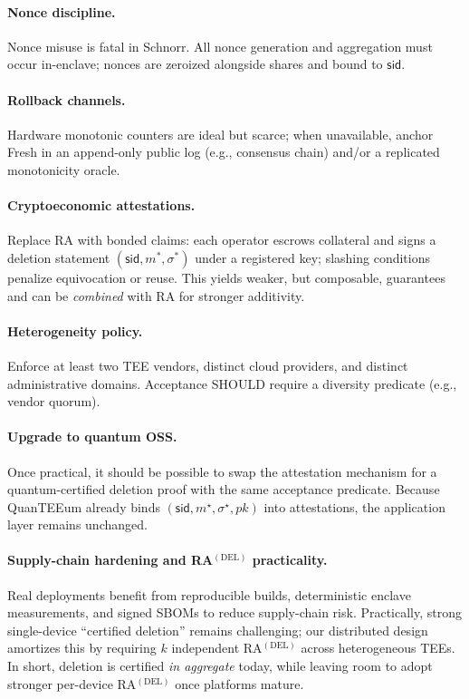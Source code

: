 \documentclass[runningheads,orivec]{llncs}
\newcommand{\prot}{\textsf{QuanTEEum}}
\newcommand{\sid}{\mathsf{sid}}
\begin{document}
\paragraph{Nonce discipline.}
Nonce misuse is fatal in Schnorr. All nonce generation and aggregation must occur in-enclave; nonces are zeroized alongside shares and bound to $\sid$.

\paragraph{Rollback channels.}
Hardware monotonic counters are ideal but scarce; when unavailable, anchor \textsf{Fresh} in an append-only public log (e.g., consensus chain) and/or a replicated monotonicity oracle.

\paragraph{Cryptoeconomic attestations.}
Replace RA with bonded claims: each operator escrows collateral and signs a deletion statement $(\sid,m^{*},\sigma^{*})$ under a registered key; slashing conditions penalize equivocation or reuse. This yields weaker, but composable, guarantees and can be \emph{combined} with RA for stronger additivity.

\paragraph{Heterogeneity policy.}
Enforce at least two TEE vendors, distinct cloud providers, and distinct administrative domains. Acceptance SHOULD require a diversity predicate (e.g., vendor quorum).

\paragraph{Upgrade to quantum OSS.}
Once practical, it should be possible to swap the attestation mechanism for a quantum-certified deletion proof with the same acceptance predicate. Because \prot{} already binds $(\mathsf{sid},m^{\star},\sigma^{\star},pk)$ into attestations, the application layer remains unchanged.

\paragraph{Supply-chain hardening and RA$^{(\mathrm{DEL})}$ practicality.}
Real deployments benefit from reproducible builds, deterministic enclave measurements, and signed SBOMs to reduce supply-chain risk. Practically, strong single-device “certified deletion” remains challenging; our distributed design amortizes this by requiring $k$ independent RA$^{(\mathrm{DEL})}$ across heterogeneous TEEs. In short, deletion is certified \emph{in aggregate} today, while leaving room to adopt stronger per-device RA$^{(\mathrm{DEL})}$ once platforms mature.
\end{document}
